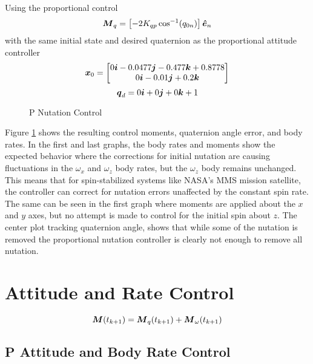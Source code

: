 Using the proportional control
\begin{equation}
  \boldsymbol{M}_{q} = \left[-2 K_{qp} \cos^{-1} (q_{0n}) \right] \boldsymbol{\hat{e}}_n
  \label{eqn:PNutationControl}
\end{equation}
with the same initial state and desired quaternion as the proportional attitude controller
\begin{equation}
  \boldsymbol{x}_0 = \begin{bmatrix} 0 \boldsymbol{i} -0.0477 \boldsymbol{j} -0.477 \boldsymbol{k} +0.8778 \\ 0 \boldsymbol{i} -0.01 \boldsymbol{j} +0.2 \boldsymbol{k} \end{bmatrix}
\end{equation}
\begin{equation}
  \boldsymbol{q}_d = 0 \boldsymbol{i} +0 \boldsymbol{j} +0 \boldsymbol{k} + 1
\end{equation}
\begin{figure}[H]
  \centerline{}
  \caption{P Nutation Control}
  \label{fig:PNutationControl}
\end{figure}
Figure \ref{fig:PNutationControl} shows the resulting control moments, quaternion angle error, and body rates.  In the first and last graphs, the body rates and moments show the expected behavior where the corrections for initial nutation are causing fluctuations in the $\omega_x$ and $\omega_z$ body rates, but the $\omega_z$ body remains unchanged.  This means that for spin-stabilized systems like NASA's MMS mission satellite, the controller can correct for nutation errors unaffected by the constant spin rate.  The same can be seen in the first graph where moments are applied about the $x$ and $y$ axes, but no attempt is made to control for the initial spin about $z$.
The center plot tracking quaternion angle, shows that while some of the nutation is removed the proportional nutation controller is clearly not enough to remove all nutation.


\section{Attitude and Rate Control}
\label{sec:AttitudeandRateControl}


\begin{equation}
    \boldsymbol{M}(t_{k+1}) = \boldsymbol{M}_{q}(t_{k+1}) + \boldsymbol{M}_{\omega}(t_{k+1})
\end{equation}




\subsection{P Attitude and Body Rate Control}
\label{subsec:PAttitudeandBodyRateControl}

